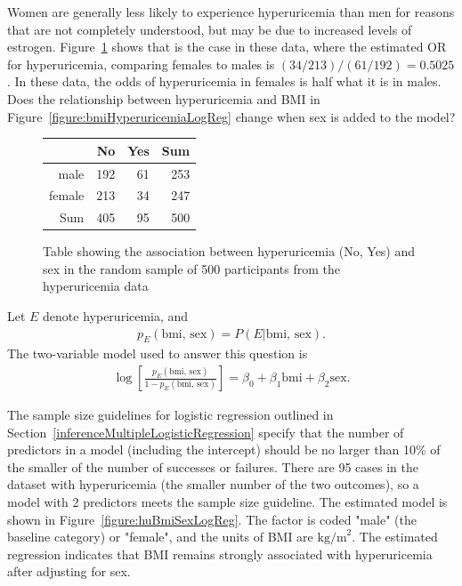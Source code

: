 Women are generally less likely to experience hyperuricemia than men for reasons that are not completely understood, but may be due to increased levels of estrogen.  Figure~\ref{figure:huSexTable} shows that is the case in these data, where the estimated OR for hyperuricemia, comparing females to males is $(34/213)/(61/192) = 0.5025$. In these data, the odds of hyperuricemia in females is half what it is in males.  Does the relationship between hyperuricemia and BMI in Figure~\ref{figure:bmiHyperuricemiaLogReg} change when sex is added to the model?

\begin{figure}[ht]
\centering
\begin{tabular}{rrrr}
  \hline
 & No & Yes & Sum \\ 
  \hline
male & 192 & 61 & 253 \\ 
  female & 213 & 34 & 247 \\ 
  Sum & 405 & 95 & 500 \\ 
   \hline
\end{tabular}
\caption{Table showing the association between hyperuricemia (No, Yes)
       and sex in the random sample of 500 participants from the hyperuricemia
       data} 
\label{figure:huSexTable}
\end{figure}

Let $E$ denote hyperuricemia, and
\begin{align*}
p_E(\text{bmi, sex}) = P(E | \text{bmi, sex}).
\end{align*}
The two-variable model used to answer this question is 
\begin{align}
\log\left[\frac{p_E(\text{bmi, sex})}{1 - p_E(\text{bmi, sex})}\right] = \beta_0 +
\beta_1 \text{bmi}  + \beta_2 \text{sex}.
\label{eqn:hyperuricemiaBMISex}
\end{align}

The sample size guidelines for logistic regression outlined  in Section~\ref{inferenceMultipleLogisticRegression} specify that the number of predictors in a model (including the intercept) should be no larger than 10\% of the smaller of the number of successes or failures.  There are 95 cases in the dataset with hyperuricemia (the smaller number of the two outcomes), so a model with 2 predictors meets the sample size guideline. The estimated model is shown in Figure~\ref{figure:huBmiSexLogReg}.  The factor  is coded "male" (the baseline category) or "female", and the units of BMI are $\text{kg/m}^2$. The estimated regression indicates that BMI remains strongly associated with hyperuricemia after adjusting for  sex.

